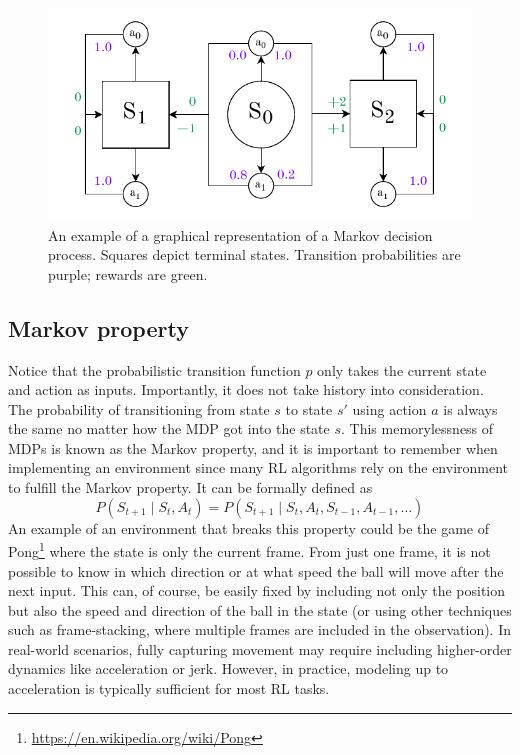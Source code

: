 \documentclass[
  digital,     %
  oneside,     %
  nosansbold,  %
  nocolorbold, %
  lof,         %
  lot,         %
]{fithesis4}
\begin{document}
\begin{figure}
    \centering
    \includegraphics[width=1\linewidth]{diagrams/mdp.pdf}
    \caption{An example of a graphical representation of a Markov decision process. Squares depict terminal states. Transition probabilities are purple; rewards are green.}
    \label{fig:mdp}
\end{figure}

\subsection{Markov property}
\label{subsec:markov_property}
Notice that the probabilistic transition function $p$ only takes the current state and action as inputs. Importantly, it does not take history into consideration. The probability of transitioning from state $s$ to state $s'$ using action $a$ is always the same no matter how the MDP got into the state $s$. This memorylessness of MDPs is known as the Markov property, and it is important to remember when implementing an environment since many RL algorithms rely on the environment to fulfill the Markov property. It can be formally defined as
\begin{equation}
P(S_{t+1}\mid S_t,A_t)=P(S_{t+1}\mid S_t,A_t,S_{t-1},A_{t-1}, \dotsc)
\end{equation}
An example of an environment that breaks this property could be the game of Pong\footnote{\url{https://en.wikipedia.org/wiki/Pong}} where the state is only the current frame. From just one frame, it is not possible to know in which direction or at what speed the ball will move after the next input. This can, of course, be easily fixed by including not only the position but also the speed and direction of the ball in the state (or using other techniques such as frame-stacking, where multiple frames are included in the observation). In real-world scenarios, fully capturing movement may require including higher-order dynamics like acceleration or jerk. However, in practice, modeling up to acceleration is typically sufficient for most RL tasks.
\end{document}
